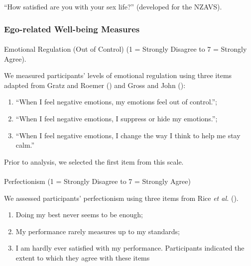 \documentclass[
  single column]{article}
\makeatletter
\let\oldparagraph\paragraph
\renewcommand{\paragraph}{
    \@ifstar
      \xxxParagraphStar
      \xxxParagraphNoStar
  }
\newcommand{\xxxParagraphStar}[1]{\oldparagraph*{#1}\mbox{}}
\newcommand{\xxxParagraphNoStar}[1]{\oldparagraph{#1}\mbox{}}
\providecommand{\tightlist}{%
  \setlength{\itemsep}{0pt}\setlength{\parskip}{0pt}}\usepackage{longtable,booktabs,array}
\makeatother
\begin{document}
``How satisfied are you with your sex life?'' (developed for the NZAVS).

\subsubsection{Ego-related Well-being
Measures}\label{ego-related-well-being-measures}

\paragraph{Emotional Regulation (Out of Control) (1 = Strongly Disagree
to 7 = Strongly
Agree).}\label{emotional-regulation-out-of-control-1-strongly-disagree-to-7-strongly-agree.}

We measured participants' levels of emotional regulation using three
items adapted from Gratz and Roemer
() and Gross and John
():

\begin{enumerate}
\def\labelenumi{(\arabic{enumi})}
\tightlist
\item
  ``When I feel negative emotions, my emotions feel out of control.'';
\item
  ``When I feel negative emotions, I suppress or hide my emotions.'';
\item
  ``When I feel negative emotions, I change the way I think to help me
  stay calm.''
\end{enumerate}

Prior to analysis, we selected the first item from this scale.

\paragraph{Perfectionism (1 = Strongly Disagree to 7 = Strongly
Agree)}\label{perfectionism-1-strongly-disagree-to-7-strongly-agree}

We assessed participants' perfectionism using three items from Rice
\emph{et al.} ().

\begin{enumerate}
\def\labelenumi{(\arabic{enumi})}
\tightlist
\item
  Doing my best never seems to be enough;
\item
  My performance rarely measures up to my standards;
\item
  I am hardly ever satisfied with my performance. Participants indicated
  the extent to which they agree with these items
\end{enumerate}
\end{document}
